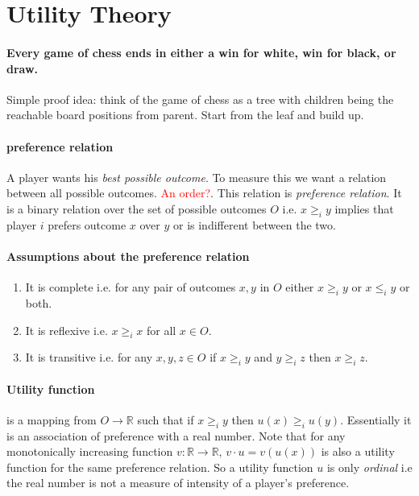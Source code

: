 \section{Utility Theory}
\paragraph{Every game of chess ends in either a win for white, win for black, or draw.}
Simple proof idea: think of the game of chess as a tree with children being the reachable board positions from parent. Start from the leaf and build up.

\paragraph{preference relation} A player wants his \textit{best possible outcome}. To measure this we want a relation between all possible outcomes. \textcolor{red}{An order?}. This relation is \textit{preference relation}.
It is a binary relation over the set of possible outcomes $O$ i.e. $x \geq_{i} y$ implies that player $i$ prefers outcome $x$ over $y$ or is indifferent between the two.

\paragraph{Assumptions about the preference relation}
\begin{enumerate}
    \item It is complete i.e. for any pair of outcomes $x, y$ in $O$ either $x \geq_{i} y$ or $x \leq_{i} y$  or both.
    \item It is reflexive i.e. $x \geq_{i} x$ for all $x \in O$.
    \item It is transitive i.e. for any $x,y,z \in O$ if $x \geq_{i} y$ and $y \geq_{i} z$ then $x \geq_{i} z$.
\end{enumerate}

\paragraph{Utility function} is a mapping from $O \to \mathbb{R}$ such that if $x \geq_{i} y$ then $u(x) \geq_{i} u(y)$. Essentially it is an association of preference with a real number.
Note that for any monotonically increasing function $v:\mathbb{R} \to \mathbb{R}$, $v \cdot u = v(u(x))$ is also a utility function for the same preference relation. So a utility function $u$ is only \textit{ordinal} i.e the real number is not a measure of intensity of a player's preference.



